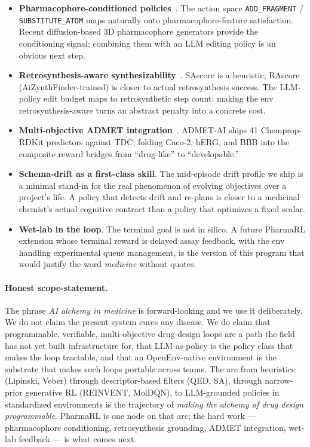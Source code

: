 \documentclass[11pt,a4paper]{article}
\begin{document}
\begin{itemize}[leftmargin=*,nosep]
  \item \textbf{Pharmacophore-conditioned policies}~\cite{wermuth1998iupac,pharmacoforge2025,pharmadiff2025,molsnapper2024}. The action space \texttt{ADD\_FRAGMENT} / \texttt{SUBSTITUTE\_ATOM} maps naturally onto pharmacophore-feature satisfaction. Recent diffusion-based 3D pharmacophore generators provide the conditioning signal; combining them with an LLM editing policy is an obvious next step.
  \item \textbf{Retrosynthesis-aware synthesizability}~\cite{thakkar2021rascore,skoraczynski2023sacritical}. SAscore is a heuristic; RAscore (AiZynthFinder-trained) is closer to actual retrosynthesis success. The LLM-policy edit budget maps to retrosynthetic step count; making the env retrosynthesis-aware turns an abstract penalty into a concrete cost.
  \item \textbf{Multi-objective ADMET integration}~\cite{swanson2024admetai,pires2015pkcsm}. ADMET-AI ships 41 Chemprop-RDKit predictors against TDC; folding Caco-2, hERG, and BBB into the composite reward bridges from ``drug-like'' to ``developable.''
  \item \textbf{Schema-drift as a first-class skill}. The mid-episode drift profile we ship is a minimal stand-in for the real phenomenon of evolving objectives over a project's life. A policy that detects drift and re-plans is closer to a medicinal chemist's actual cognitive contract than a policy that optimizes a fixed scalar.
  \item \textbf{Wet-lab in the loop}. The terminal goal is not in silico. A future PharmaRL extension whose terminal reward is delayed assay feedback, with the env handling experimental queue management, is the version of this program that would justify the word \emph{medicine} without quotes.
\end{itemize}

\paragraph{Honest scope-statement.} The phrase \emph{AI alchemy in medicine} is forward-looking and we use it deliberately. We do not claim the present system cures any disease. We do claim that programmable, verifiable, multi-objective drug-design loops are a path the field has not yet built infrastructure for, that LLM-as-policy is the policy class that makes the loop tractable, and that an OpenEnv-native environment is the substrate that makes such loops portable across teams. The arc from heuristics (Lipinski, Veber) through descriptor-based filters (QED, SA), through narrow-prior generative RL (REINVENT, MolDQN), to LLM-grounded policies in standardized environments is the trajectory of \emph{making the alchemy of drug design programmable}. PharmaRL is one node on that arc; the hard work --- pharmacophore conditioning, retrosynthesis grounding, ADMET integration, wet-lab feedback --- is what comes next.
\end{document}
